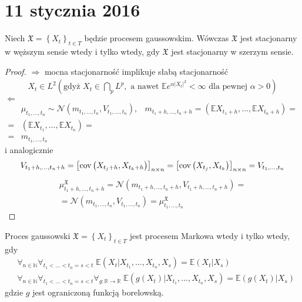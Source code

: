 \chapter{11 stycznia 2016}
\begin{twr}
Niech $ \mathfrak X=\left\{X_t\right\}_{t\in T} $ będzie procesem gaussowskim. Wówczas $ \mathfrak X $ jest stacjonarny w węższym sensie wtedy i tylko wtedy, gdy $ \mathfrak X $ jest stacjonarny w szerzym sensie.
\begin{proof}
$ \Rightarrow $
mocna stacjonarność implikuje słabą stacjonarność
\begin{gather*}
X_t\in L^2\left(\text{gdyż }X_t\in \bigcap_pL^p,\text{ a nawet }\mathbb E e^{\alpha|X_t|^2}<\infty \text{ dla pewnej }\alpha>0\right)
\end{gather*}
$ \Leftarrow $
\begin{align*}
&\mu_{t_1,\dots,t_n}\sim\mathcal N\left(m_{t_1,\dots,t_n},V_{t_1,\dots,t_n}\right),
&m_{t_1+h,\dots,t_n+h}=
\left(\mathbb E X_{t_1+h},\dots,\mathbb E X_{t_n+h}\right)
=\\=&
\left(\mathbb E X_{t_1},\dots,\mathbb E X_{t_n}\right)
=\\=&
m_{t_1,\dots,t_n}
\end{align*}
i analogicznie
\begin{gather*}
V_{t_1+h,\dots,t_n+h}=
\left[\text{cov}\left(X_{t_j+h},X_{t_k+h}\right)\right]_{n\times n}=
\left[\text{cov}\left(X_{t_j},X_{t_k}\right)\right]_{n\times n}=
V_{t_1,\dots,t_n}
\end{gather*}
\begin{gather*}
\mu_{t_1+h,\dots,t_n+h}^\mathfrak X=
\mathcal N\left(m_{t_1+h,\dots,t_n+h},V_{t_1+h,\dots,t_n+h}\right)
=\\=
\mathcal N\left(m_{t_1,\dots,t_n},V_{t_1,\dots,t_n}\right)=
\mu_{t_1,\dots,t_n}^\mathfrak X
\end{gather*}
\end{proof}
\end{twr}
\begin{twr}
Proces gaussowski $ \mathfrak X=\left\{X_t\right\} _{t\in T}$ jest procesem Markowa wtedy i tylko wtedy, gdy
\begin{align*}
&\forall_{n\in \mathbb N }\forall_{t_1<\dots<t_n=s<t}\;
\mathbb E \left(X_t|X_{t_1},\dots,X_{t_n},X_s\right)=
\mathbb E \left(X_t|X_s\right)\\
&\forall_{n\in \mathbb N }\forall_{t_1<\dots<t_n=s<t}\forall_{g:\mathbb R \to \mathbb R }\;
\mathbb E \left(g\left(X_t\right)|X_{t_1},\dots,X_{t_n},X_s\right)=
\mathbb E \left(g\left(X_t\right)|X_s\right)
\end{align*}
gdzie $ g $ jest ograniczoną funkcją borelowską.
\end{twr}
